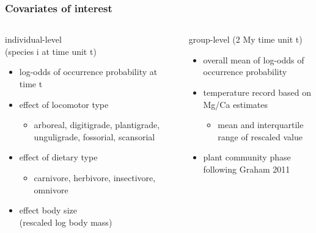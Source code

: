 \documentclass{beamer}
\begin{document}
\begin{frame}
  \frametitle{Covariates of interest}
  \begin{columns}
    \begin{column}{0.5\textwidth}
      individual-level \\(species i at time unit t)
      \begin{itemize}
        \item log-odds of occurrence probability at time t
        \item effect of locomotor type
          \begin{itemize}
            \item arboreal, digitigrade, plantigrade, unguligrade, fossorial, scansorial
          \end{itemize}
        \item effect of dietary type
          \begin{itemize}
            \item carnivore, herbivore, insectivore, omnivore
          \end{itemize}
        \item effect body size \\(rescaled log body mass)
      \end{itemize}
    \end{column}
    \begin{column}{0.5\textwidth}
      group-level (2 My time unit t)
      \begin{itemize}
        \item overall mean of log-odds of occurrence probability
        \item temperature record based on Mg/Ca estimates
          \begin{itemize}
            \item mean and interquartile range of rescaled value
          \end{itemize}
        \item plant community phase following Graham 2011
      \end{itemize}
    \end{column}
  \end{columns}
\end{frame}
\end{document}
